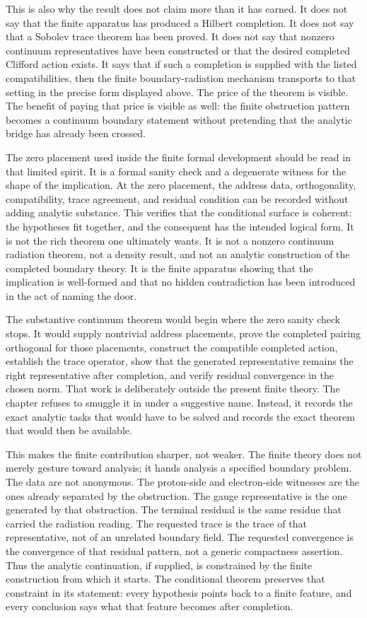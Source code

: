 This is also why the result does not claim more than it has earned. It does not
say that the finite apparatus has produced a Hilbert completion. It does not say
that a Sobolev trace theorem has been proved. It does not say that nonzero
continuum representatives have been constructed or that the desired completed
Clifford action exists. It says that if such a completion is supplied with the
listed compatibilities, then the finite boundary-radiation mechanism transports
to that setting in the precise form displayed above. The price of the theorem is
visible. The benefit of paying that price is visible as well: the finite
obstruction pattern becomes a continuum boundary statement without pretending
that the analytic bridge has already been crossed.

The zero placement used inside the finite formal development should be read in
that limited spirit. It is a formal sanity check and a degenerate witness for
the shape of the implication. At the zero placement, the address data,
orthogonality, compatibility, trace agreement, and residual condition can be
recorded without adding analytic substance. This verifies that the conditional
surface is coherent: the hypotheses fit together, and the consequent has the
intended logical form. It is not the rich theorem one ultimately wants. It is
not a nonzero continuum radiation theorem, not a density result, and not an
analytic construction of the completed boundary theory. It is the finite
apparatus showing that the implication is well-formed and that no hidden
contradiction has been introduced in the act of naming the door.

The substantive continuum theorem would begin where the zero sanity check stops.
It would supply nontrivial address placements, prove the completed pairing
orthogonal for those placements, construct the compatible completed action,
establish the trace operator, show that the generated representative remains the
right representative after completion, and verify residual convergence in the
chosen norm. That work is deliberately outside the present finite theory. The
chapter refuses to smuggle it in under a suggestive name. Instead, it records the
exact analytic tasks that would have to be solved and records the exact theorem
that would then be available.

This makes the finite contribution sharper, not weaker. The finite theory does
not merely gesture toward analysis; it hands analysis a specified boundary
problem. The data are not anonymous. The proton-side and electron-side witnesses
are the ones already separated by the obstruction. The gauge representative is
the one generated by that obstruction. The terminal residual is the same residue
that carried the radiation reading. The requested trace is the trace of that
representative, not of an unrelated boundary field. The requested convergence is
the convergence of that residual pattern, not a generic compactness assertion.
Thus the analytic continuation, if supplied, is constrained by the finite
construction from which it starts. The conditional theorem preserves that
constraint in its statement: every hypothesis points back to a finite feature,
and every conclusion says what that feature becomes after completion.

